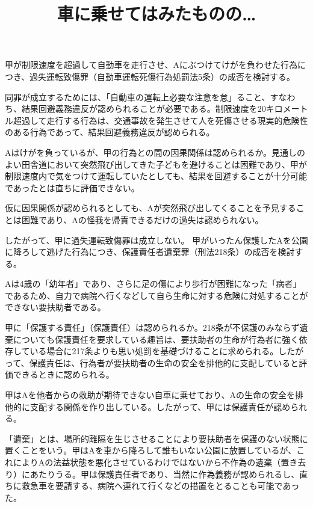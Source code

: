 \documentclass[
  jafontsize=11bp,
  jafontscale=0.92,
   jfm_yoko=jlreq,
  jlreq_notes,
]{jlreq}
\title{\vspace{-30mm}\Large \fbox{32} \sffamily 車に乗せてはみたものの…}
\date{\vspace{-15mm}}
\begin{document}
\maketitle

	\sectionB{}
		甲が制限速度を超過して自動車を走行させ、Aにぶつけてけがを負わせた行為につき、過失運転致傷罪（自動車運転死傷行為処罰法5条）の成否を検討する。
		
		同罪が成立するためには、「自動車の運転上必要な注意を怠」ること、すなわち、結果回避義務違反が認められることが必要である。制限速度を20キロメートル超過して走行する行為は、交通事故を発生させて人を死傷させる現実的危険性のある行為であって、結果回避義務違反が認められる。
		
		Aはけがを負っているが、甲の行為との間の因果関係は認められるか。見通しのよい田舎道において突然飛び出してきた子どもを避けることは困難であり、甲が制限速度内で気をつけて運転していたとしても、結果を回避することが十分可能であったとは直ちに評価できない。
		
		仮に因果関係が認められるとしても、Aが突然飛び出してくることを予見することは困難であり、Aの怪我を帰責できるだけの過失は認められない。
		
		したがって、甲に過失運転致傷罪は成立しない。
	\sectionB{}
	  甲がいったん保護したAを公園に降ろして逃げた行為につき、保護責任者遺棄罪（刑法218条）の成否を検討する。
	  
	  \sectionC{}
	  	Aは4歳の「幼年者」であり、さらに足の傷により歩行が困難になった「病者」であるため、自力で病院へ行くなどして自ら生命に対する危険に対処することができない要扶助者である。
	  
	  \sectionC{}
	  	甲に「保護する責任」（保護責任）は認められるか。218条が不保護のみならず遺棄についても保護責任を要求している趣旨は、要扶助者の生命が行為者に強く依存している場合に217条よりも思い処罰を基礎づけることに求められる。したがって、保護責任は、行為者が要扶助者の生命の安全を排他的に支配していると評価できるときに認められる。
	  	
	  	甲はAを他者からの救助が期待できない自車に乗せており、Aの生命の安全を排他的に支配する関係を作り出している。したがって、甲には保護責任が認められる。
	  	
	  \sectionC{}
	   「遺棄」とは、場所的離隔を生じさせることにより要扶助者を保護のない状態に置くことをいう。甲はAを車から降ろして誰もいない公園に放置しているが、これによりAの法益状態を悪化させているわけではないから不作為の遺棄（置き去り）にあたりうる。甲は保護責任者であり、当然に作為義務が認められるし、直ちに救急車を要請する、病院へ連れて行くなどの措置をとることも可能であった。
	   
\end{document}
